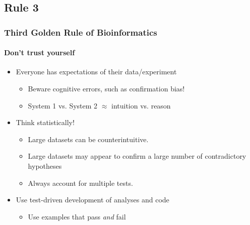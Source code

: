 %

\subsection{Rule 3}
\begin{frame}
  \frametitle{Third Golden Rule of Bioinformatics}
  \framesubtitle{Don't trust yourself}
  \begin{itemize}
    \item Everyone has expectations of their data/experiment
    \begin{itemize}
      \item Beware cognitive errors, such as confirmation bias!
      \item System 1 vs. System 2 $\approx$ intuition vs. reason
    \end{itemize}
    \item Think statistically! 
    \begin{itemize}
      \item Large datasets can be counterintuitive.
      \item Large datasets may appear to confirm a large number of contradictory hypotheses
      \item Always account for multiple tests.
    \end{itemize}
    \item Use test-driven development of analyses and code
    \begin{itemize}
      \item Use examples that pass \textit{and} fail
    \end{itemize}	  
  \end{itemize}
\end{frame}
